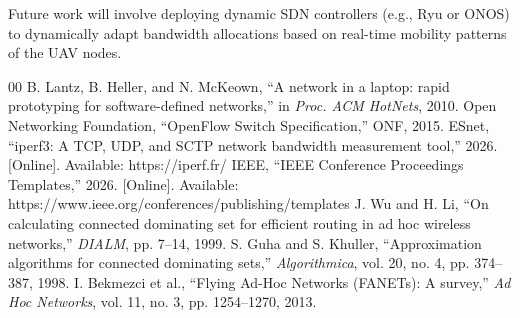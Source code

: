 \documentclass[conference]{IEEEtran}
\begin{document}
Future work will involve deploying dynamic SDN controllers (e.g., Ryu or ONOS) to dynamically adapt bandwidth allocations based on real-time mobility patterns of the UAV nodes.

\begin{thebibliography}{00}
 B. Lantz, B. Heller, and N. McKeown, ``A network in a laptop: rapid prototyping for software-defined networks,'' in \textit{Proc. ACM HotNets}, 2010.
 Open Networking Foundation, ``OpenFlow Switch Specification,'' ONF, 2015.
 ESnet, ``iperf3: A TCP, UDP, and SCTP network bandwidth measurement tool,'' 2026. [Online]. Available: https://iperf.fr/
 IEEE, ``IEEE Conference Proceedings Templates,'' 2026. [Online]. Available: https://www.ieee.org/conferences/publishing/templates
 J. Wu and H. Li, ``On calculating connected dominating set for efficient routing in ad hoc wireless networks,'' \textit{DIALM}, pp. 7--14, 1999.
 S. Guha and S. Khuller, ``Approximation algorithms for connected dominating sets,'' \textit{Algorithmica}, vol. 20, no. 4, pp. 374--387, 1998.
 I. Bekmezci et al., ``Flying Ad-Hoc Networks (FANETs): A survey,'' \textit{Ad Hoc Networks}, vol. 11, no. 3, pp. 1254--1270, 2013.
\end{thebibliography}
\end{document}
